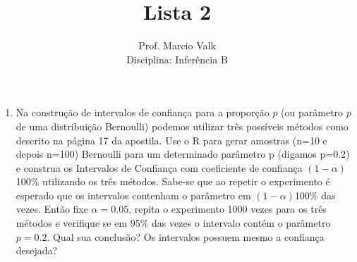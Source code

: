 \documentclass[11pt,brazil,addpoints]{exam}
\begin{document}
\title{Lista 2}


\author{
  Prof. Marcio Valk \\
  Disciplina: Inferência B\\
%
  \date{}
}


\maketitle


\begin{enumerate}[1.]

\item Na construção de intervalos de confiança para a proporção $p$ (ou parâmetro $p$ de uma distribuição Bernoulli) podemos utilizar três possíveis métodos como descrito na página 17 da apostila. Use o R para gerar amostras (n=10 e depois n=100) Bernoulli para um determinado parâmetro p (digamos p=0.2) e construa os Intervalos de Confiança com coeficiente de confiança $(1-\alpha)$100\% utilizando os três métodos. Sabe-se que ao repetir o experimento é esperado que os intervalos contenham o parâmetro em $(1-\alpha)$100\% das vezes. Então fixe $\alpha =0.05$, repita o experimento 1000 vezes para os três métodos e verifique se em 95\% das vezes o intervalo contém o parâmetro $p=0.2$. Qual sua conclusão? Os intervalos possuem mesmo a confiança desejada?


\end{enumerate}
\end{document}
